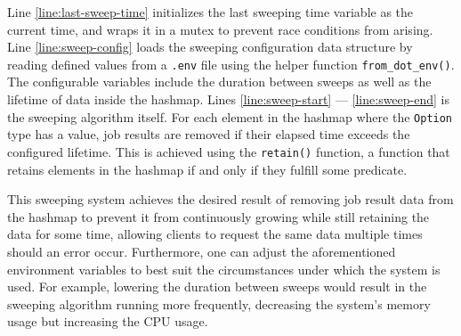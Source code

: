 Line \ref{line:last-sweep-time} initializes the last sweeping time variable as the current time, and wraps it in a mutex to prevent race conditions from arising.
Line \ref{line:sweep-config} loads the sweeping configuration data structure by reading defined values from a \texttt{.env} file using the helper function \texttt{from\_dot\_env()}.
The configurable variables include the duration between sweeps as well as the lifetime of data inside the hashmap.
Lines \ref{line:sweep-start} --- \ref{line:sweep-end} is the sweeping algorithm itself.
For each element in the hashmap where the \texttt{Option} type has a value, job results are removed if their elapsed time exceeds the configured lifetime.
This is achieved using the \texttt{retain()} function, a function that retains elements in the hashmap if and only if they fulfill some predicate.

This sweeping system achieves the desired result of removing job result data from the hashmap to prevent it from continuously growing while still retaining the data for some time, allowing clients to request the same data multiple times should an error occur.
Furthermore, one can adjust the aforementioned environment variables to best suit the circumstances under which the system is used.
For example, lowering the duration between sweeps would result in the sweeping algorithm running more frequently, decreasing the system's memory usage but increasing the CPU usage.